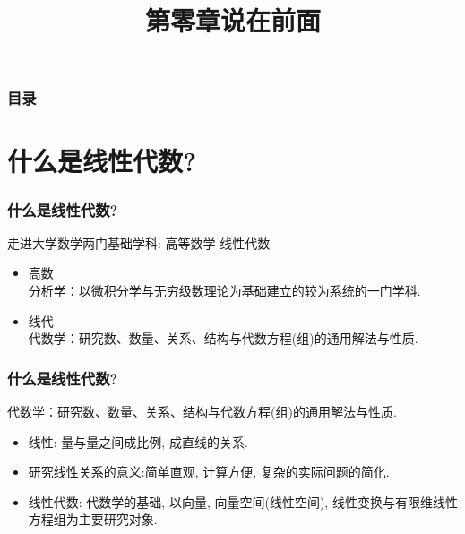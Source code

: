 \documentclass{beamer}
\begin{document}
\title{第零章\:\:说在前面}     %
    \begin{frame}
        \titlepage   %
    \end{frame}
	
	\begin{frame}
		\frametitle{目录}
		\tableofcontents[pausesections]
	\end{frame}
	
	\section{什么是线性代数?}
	\begin{frame}
		\frametitle{什么是线性代数?}
		走进大学数学\quad  \pause  两门基础学科:  高等数学 \: 线性代数\pause
		\begin{itemize}
			\item 高数\\ 分析学：以微积分学与无穷级数理论为基础建立的较为系统的一门学科.\pause
			\item 线代\\ 代数学：研究数、数量、关系、结构与代数方程(组)的通用解法与性质.
		\end{itemize}
	\end{frame}

	\begin{frame}
	\frametitle{什么是线性代数?}
	代数学：研究数、数量、关系、结构与代数方程(组)的通用解法与性质.\pause
	\begin{itemize}
		\item 线性: 量与量之间成比例, 成直线的关系. \pause
		\item 研究线性关系的意义:简单直观, 计算方便, 复杂的实际问题的简化.\pause
		\item 线性代数: 代数学的基础, 以向量, 向量空间(线性空间), 线性变换与有限维线性方程组为主要研究对象. 
	\end{itemize}
	\end{frame}
\end{document}
